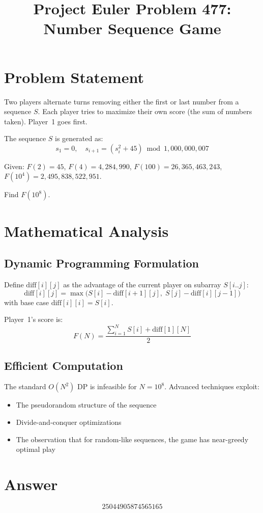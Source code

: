 \documentclass[12pt]{article}
\title{Project Euler Problem 477: Number Sequence Game}
\author{}
\date{}
\begin{document}
\maketitle

\section{Problem Statement}
Two players alternate turns removing either the first or last number from a sequence $S$. Each player tries to maximize their own score (the sum of numbers taken). Player~1 goes first.

The sequence $S$ is generated as:
\[
s_1 = 0, \quad s_{i+1} = (s_i^2 + 45) \bmod 1{,}000{,}000{,}007
\]

Given: $F(2)=45$, $F(4)=4{,}284{,}990$, $F(100)=26{,}365{,}463{,}243$, $F(10^4)=2{,}495{,}838{,}522{,}951$.

Find $F(10^8)$.

\section{Mathematical Analysis}

\subsection{Dynamic Programming Formulation}
Define $\text{diff}[i][j]$ as the advantage of the current player on subarray $S[i..j]$:
\[
\text{diff}[i][j] = \max\bigl(S[i] - \text{diff}[i+1][j],\; S[j] - \text{diff}[i][j-1]\bigr)
\]
with base case $\text{diff}[i][i] = S[i]$.

Player~1's score is:
\[
F(N) = \frac{\sum_{i=1}^{N} S[i] + \text{diff}[1][N]}{2}
\]

\subsection{Efficient Computation}
The standard $O(N^2)$ DP is infeasible for $N = 10^8$. Advanced techniques exploit:
\begin{itemize}
    \item The pseudorandom structure of the sequence
    \item Divide-and-conquer optimizations
    \item The observation that for random-like sequences, the game has near-greedy optimal play
\end{itemize}

\section{Answer}

\[
\boxed{25044905874565165}
\]
\end{document}
